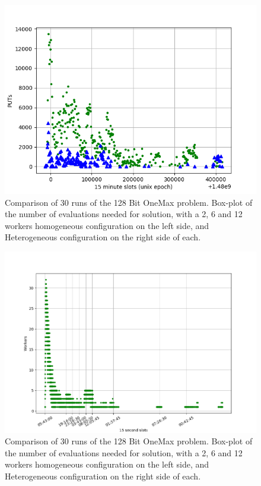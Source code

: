 \documentclass{llncs}
\begin{document}
\begin{figure}[t]
    \centering
        \includegraphics[width=5in]{img/puts_by_time.png}
    \caption{Comparison of 30 runs of the 128 Bit OneMax problem. 
    Box-plot of the number of evaluations needed for solution, with a 2, 6 and 12 workers
    homogeneous configuration on the left side, and Heterogeneous configuration on the
    right side of each.
    }
    \label{fig:comp-onemax}
\end{figure}
\begin{figure}[t]
    \centering
        \includegraphics[width=5in]{img/workers_best_user.png}
    \caption{Comparison of 30 runs of the 128 Bit OneMax problem. 
    Box-plot of the number of evaluations needed for solution, with a 2, 6 and 12 workers
    homogeneous configuration on the left side, and Heterogeneous configuration on the
    right side of each.
    }
    \label{fig:comp-onemax}
\end{figure}
\end{document}
